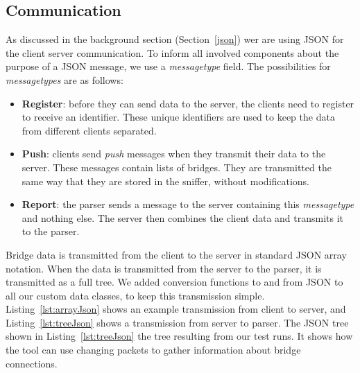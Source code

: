 \subsection{Communication}
\label{communication}
As discussed in the background section (Section~\ref{json}) wer are using JSON for the client server communication.
To inform all involved components about the purpose of a JSON message, we use a \textit{messagetype} field.
The possibilities for \textit{messagetypes} are as follows:
\begin{itemize}
    \item \textbf{Register}: before they can send data to the server, the clients need to register to receive an identifier.
        These unique identifiers are used to keep the data from different clients separated.
    \item \textbf{Push}: clients send \textit{push} messages when they transmit their data to the server.
        These messages contain lists of bridges.
        They are transmitted the same way that they are stored in the sniffer, without modifications.
    \item \textbf{Report}: the parser sends a message to the server containing this \textit{messagetype} and nothing else.
        The server then combines the client data and transmits it to the parser.
\end{itemize}
Bridge data is transmitted from the client to the server in standard JSON array notation.
When the data is transmitted from the server to the parser, it is transmitted as a full tree.
We added conversion functions to and from JSON to all our custom data classes, to keep this transmission simple.
Listing~\ref{lst:arrayJson} shows an example transmission from client to server, and Listing~\ref{lst:treeJson} shows a transmission from server to parser.
The JSON tree shown in Listing~\ref{lst:treeJson} the tree resulting from our test runs.
It shows how the tool can use changing packets to gather information about bridge connections.



